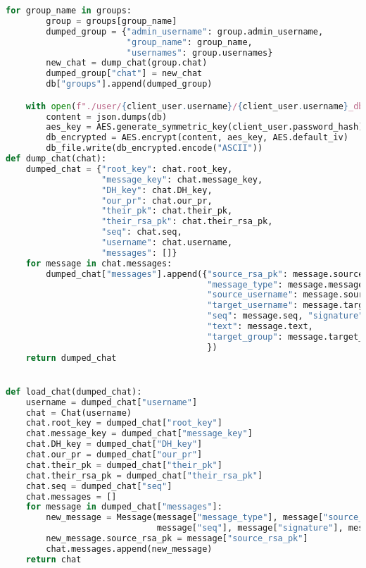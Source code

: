 \begin{latin}
\begin{lstlisting}[firstnumber=35, language=Python]
    for group_name in groups:
        group = groups[group_name]
        dumped_group = {"admin_username": group.admin_username,
                        "group_name": group_name,
                        "usernames": group.usernames}
        new_chat = dump_chat(group.chat)
        dumped_group["chat"] = new_chat
        db["groups"].append(dumped_group)

    with open(f"./user/{client_user.username}/{client_user.username}_db.imal", 'wb') as db_file:
        content = json.dumps(db)
        aes_key = AES.generate_symmetric_key(client_user.password_hash)
        db_encrypted = AES.encrypt(content, aes_key, AES.default_iv)
        db_file.write(db_encrypted.encode("ASCII"))
def dump_chat(chat):
    dumped_chat = {"root_key": chat.root_key,
                   "message_key": chat.message_key,
                   "DH_key": chat.DH_key,
                   "our_pr": chat.our_pr,
                   "their_pk": chat.their_pk,
                   "their_rsa_pk": chat.their_rsa_pk,
                   "seq": chat.seq,
                   "username": chat.username,
                   "messages": []}
    for message in chat.messages:
        dumped_chat["messages"].append({"source_rsa_pk": message.source_rsa_pk,
                                        "message_type": message.message_type,
                                        "source_username": message.source_username,
                                        "target_username": message.target_username,
                                        "seq": message.seq, "signature": message.signature,
                                        "text": message.text,
                                        "target_group": message.target_group
                                        })
    return dumped_chat


def load_chat(dumped_chat):
    username = dumped_chat["username"]
    chat = Chat(username)
    chat.root_key = dumped_chat["root_key"]
    chat.message_key = dumped_chat["message_key"]
    chat.DH_key = dumped_chat["DH_key"]
    chat.our_pr = dumped_chat["our_pr"]
    chat.their_pk = dumped_chat["their_pk"]
    chat.their_rsa_pk = dumped_chat["their_rsa_pk"]
    chat.seq = dumped_chat["seq"]
    chat.messages = []
    for message in dumped_chat["messages"]:
        new_message = Message(message["message_type"], message["source_username"], message["target_username"],
                              message["seq"], message["signature"], message["text"], message["target_group"])
        new_message.source_rsa_pk = message["source_rsa_pk"]
        chat.messages.append(new_message)
    return chat



\end{lstlisting}
\end{latin}
